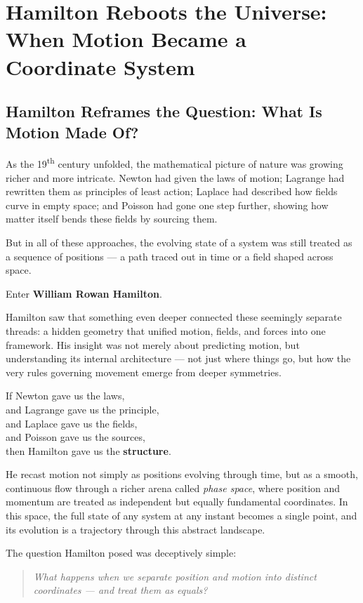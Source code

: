 \section{Hamilton Reboots the Universe: When Motion Became a Coordinate System}

\subsection{Hamilton Reframes the Question: What Is Motion Made Of?}

As the 19\textsuperscript{th} century unfolded, the mathematical picture of nature was growing richer and more intricate. Newton had given the laws of motion; Lagrange had rewritten them as principles of least action; Laplace had described how fields curve in empty space; and Poisson had gone one step further, showing how matter itself bends these fields by sourcing them.

But in all of these approaches, the evolving state of a system was still treated as a sequence of positions — a path traced out in time or a field shaped across space.

Enter \textbf{William Rowan Hamilton}.

Hamilton saw that something even deeper connected these seemingly separate threads: a hidden geometry that unified motion, fields, and forces into one framework. His insight was not merely about predicting motion, but understanding its internal architecture — not just where things go, but how the very rules governing movement emerge from deeper symmetries.

If Newton gave us the laws,\\
and Lagrange gave us the principle,\\
and Laplace gave us the fields,\\
and Poisson gave us the sources,\\
then Hamilton gave us the \textbf{structure}.

He recast motion not simply as positions evolving through time, but as a smooth, continuous flow through a richer arena called \emph{phase space}, where position and momentum are treated as independent but equally fundamental coordinates. In this space, the full state of any system at any instant becomes a single point, and its evolution is a trajectory through this abstract landscape.

The question Hamilton posed was deceptively simple:

\begin{quote}
\textit{What happens when we separate position and motion into distinct coordinates — and treat them as equals?}
\end{quote}

